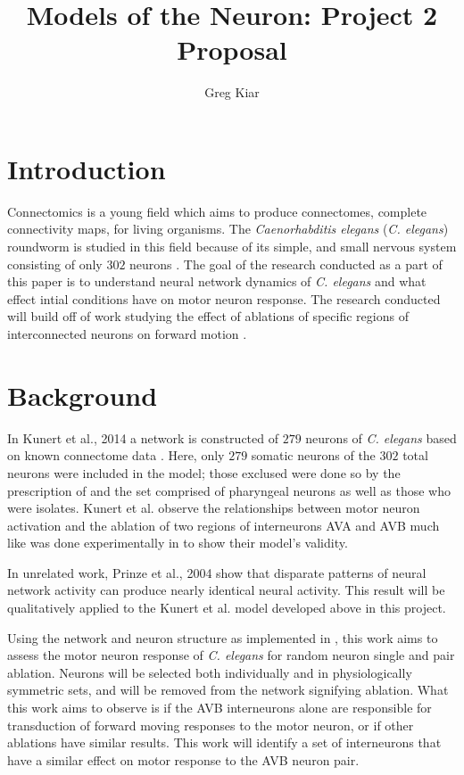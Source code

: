 \documentclass[11pt]{report} %
\title{Models of the Neuron: Project 2 Proposal}
\author{Greg Kiar}
\begin{document}
\maketitle

\section{Introduction}

Connectomics is a young field which aims to produce connectomes, complete connectivity maps, for living organisms. The \emph{Caenorhabditis elegans} (\emph{C. elegans}) roundworm is studied in this field because of its simple, and small nervous system consisting of only $302$ neurons \cite{White1986,Dunn2003}. The goal of the research conducted as a part of this paper is to understand neural network dynamics of \emph{C. elegans} and what effect intial conditions have on motor neuron response. The research conducted will build off of work studying the effect of ablations of specific regions of interconnected neurons on forward motion \cite{Kunert2014}.

\section{Background}

In Kunert et al., 2014 \cite{Kunert2014} a network is constructed of $279$ neurons of \emph{C. elegans} based on known connectome data \cite{Varshney2011}. Here, only $279$ somatic neurons of the $302$ total neurons were included in the model; those exclused were done so by the prescription of \cite{Varshney2011} and the set comprised of pharyngeal neurons as well as those who were isolates. Kunert et al. observe the relationships between motor neuron activation and the ablation of two regions of interneurons AVA and AVB much like was done experimentally in \cite{Chalfie1985} to show their model's validity.

In unrelated work, Prinze et al., 2004 \cite{Prinz2004} show that disparate patterns of neural network activity can produce nearly identical neural activity. This result will be qualitatively applied to the Kunert et al. model developed above in this project.


Using the network and neuron structure as implemented in \cite{Kunert2014}, this work aims to assess the motor neuron response of \emph{C. elegans} for random neuron single and pair ablation. Neurons will be selected both individually and in physiologically symmetric sets, and will be removed from the network signifying ablation. What this work aims to observe is if the AVB interneurons alone are responsible for transduction of forward moving responses to the motor neuron, or if other ablations have similar results. This work will identify a set of interneurons that have a similar effect on motor response to the AVB neuron pair.

{}

\end{document}
